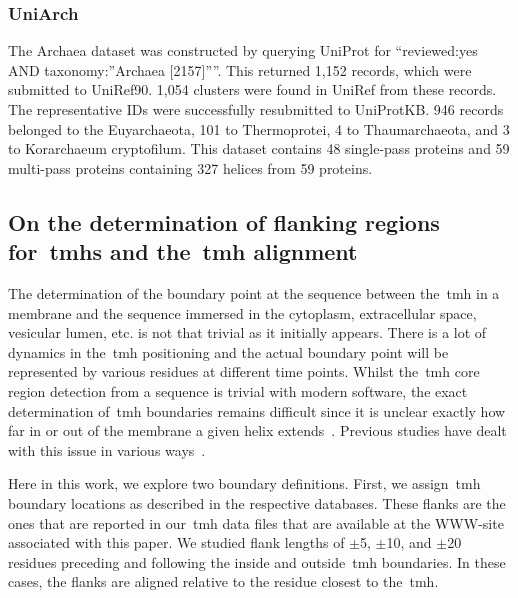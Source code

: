 \subsubsection{UniArch}
The Archaea dataset was constructed by querying UniProt for ``reviewed:yes AND taxonomy:''Archaea [2157]''''.
This returned 1,152 records, which were submitted to UniRef90.
1,054 clusters were found in UniRef from these records.
The representative IDs were successfully resubmitted to UniProtKB.
946 records belonged to the Euyarchaeota, 101 to Thermoprotei, 4 to Thaumarchaeota, and 3 to Korarchaeum cryptofilum.
This dataset contains 48 single-pass proteins and 59 multi-pass proteins containing 327 helices from 59 proteins.


\subsection{On the determination of flanking regions for~\gls{tmh}s and the~\gls{tmh} alignment}

The determination of the boundary point at the sequence between the~\gls{tmh} in a membrane and the sequence immersed in the cytoplasm, extracellular space, vesicular lumen, etc.
is not that trivial as it initially appears.
There is a lot of dynamics in the~\gls{tmh} positioning and the actual boundary point will be represented by various residues at different time points.
Whilst the~\gls{tmh} core region detection from a sequence is trivial with modern software, the exact determination of~\gls{tmh} boundaries remains difficult since it is unclear exactly how far in or out of the membrane a given helix extends~\cite{Ojemalm2013}.
Previous studies have dealt with this issue in various ways~\cite{Sharpe2010,Baeza-Delgado2013,Pogozheva2013, White2008}.

Here in this work, we explore two boundary definitions.
First, we assign~\gls{tmh} boundary locations as described in the respective databases.
These flanks are the ones that are reported in our~\gls{tmh} data files that are available at the WWW-site associated with this paper.
We studied flank lengths of $\pm$5, $\pm$10, and $\pm$20 residues preceding and following the inside and outside~\gls{tmh} boundaries.
In these cases, the flanks are aligned relative to the residue closest to the~\gls{tmh}.

